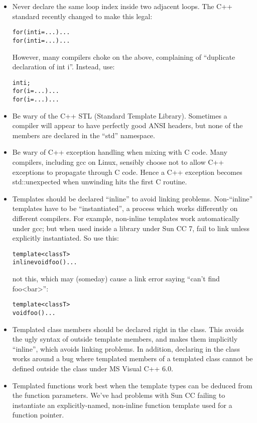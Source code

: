 \begin{itemize}

\item Never declare the same loop index inside two adjacent loops.
The C++ standard recently changed to make this legal:
\begin{alltt}
for (int i=...) ...
for (int i=...) ...
\end{alltt}
However, many compilers choke on the above, complaining of 
``duplicate declaration of int i''.  Instead, use:
\begin{alltt}
int i;
for (i=...) ...
for (i=...) ...
\end{alltt}

\item Be wary of the C++ STL (Standard Template Library).
Sometimes a compiler will appear to have perfectly good
ANSI headers, but none of the members are declared in the ``std''
namespace.

\item Be wary of C++ exception handling when mixing with C code. 
Many compilers, including gcc on Linux, sensibly choose not 
to allow C++ exceptions to propagate through C code.  Hence
a C++ exception becomes std::unexpected when unwinding hits
the first C routine.

\item Templates should be declared ``inline'' to avoid linking problems.
Non-``inline'' templates have to be ``instantiated'',
a process which works differently on different compilers.
For example, non-inline templates work automatically under gcc;
but when used inside a library under Sun CC 7, fail to link
unless explicitly instantiated. So use this:
\begin{alltt}
template <class T>
inline void foo() {...}
\end{alltt}
not this, which may (someday) cause a link error saying ``can't find
foo\textless bar\textgreater'':
\begin{alltt}
template <class T>
void foo() {...}
\end{alltt}

\item Templated class members should be declared right in the class. 
This avoids the ugly syntax of outside template members, and 
makes them implicitly ``inline'', which avoids linking problems.
In addition, declaring in the class works around a bug where
templated members of a templated class cannot be defined outside the 
class under MS Visual C++ 6.0.

\item Templated functions work best when the template types can 
be deduced from the function parameters.  We've had problems with
Sun CC failing to instantiate an explicitly-named, non-inline
function template used for a function pointer.  


\end{itemize}
